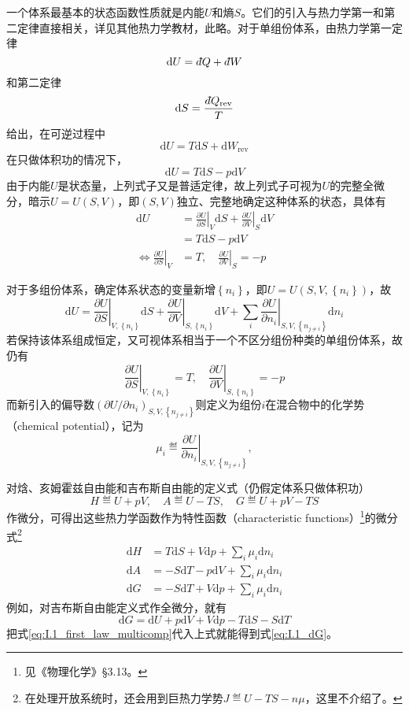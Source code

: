 \documentclass[main.tex]{subfiles}
\begin{document}
一个体系最基本的状态函数性质就是内能$U$和熵$S$。它们的引入与热力学第一和第二定律直接相关，详见其他热力学教材，此略。对于单组份体系，由热力学第一定律
\[\mathrm{d}U=d\hspace*{-0.08em}\bar{}\hspace*{0.1em} Q+d\hspace*{-0.08em}\bar{}\hspace*{0.1em} W\]
和第二定律
\[\mathrm{d} S=\frac{d\hspace*{-0.08em}\bar{}\hspace*{0.1em} Q_\text{rev}}{T}\]
给出，在可逆过程中
\[\mathrm{d}U=T\mathrm{d}S+\mathrm{d}W_\text{rev}\]
在只做体积功的情况下，
\[\mathrm{d}U=T\mathrm{d}S-p\mathrm{d}V\]
由于内能$U$是状态量，上列式子又是普适定律，故上列式子可视为$U$的完整全微分，暗示$U=U\left(S,V\right)$，即$\left(S,V\right)$独立、完整地确定这种体系的状态，具体有
\begin{align*}
    \mathrm{d}U                                                   & =\left.\frac{\partial U}{\partial S}\right|_V\mathrm{d}S+\left.\frac{\partial U}{\partial V}\right|_{S}\mathrm{d}V \\
                                                                  & =T\mathrm{d}S-p\mathrm{d}V                                                                                         \\
    \Leftrightarrow\left.\frac{\partial U}{\partial S}\right|_{V} & =T,\quad\left.\frac{\partial U}{\partial V}\right|_{S}=-p
\end{align*}

对于多组份体系，确定体系状态的变量新增$\left\{n_i\right\}$，即$U=U\left(S,V,\left\{n_i\right\}\right)$，故
\begin{equation}\label{eq:I.1_first_law_multicomp}
    \mathrm{d}U=\left.\frac{\partial U}{\partial S}\right|_{V,\left\{n_i\right\}}\mathrm{d}S+\left.\frac{\partial U}{\partial V}\right|_{S,\left\{n_i\right\}}\mathrm{d}V+\sum_i\left.\frac{\partial U}{\partial n_i}\right|_{S,V,\left\{n_{j\neq i}\right\}}\mathrm{d}n_i
\end{equation}
若保持该体系组成恒定，又可视体系相当于一个不区分组份种类的单组份体系，故仍有
\[\left.\frac{\partial U}{\partial S}\right|_{V,\left\{n_i\right\}}=T,\quad\left.\frac{\partial U}{\partial V}\right|_{S,\left\{n_i\right\}}=-p\]
而新引入的偏导数$\left(\partial U/\partial n_i\right)_{S,V,\left\{n_{j\neq i}\right\}}$则定义为组份$i$在混合物中的化学势（chemical potential），记为
\[\mu_i\eqdef\left.\frac{\partial U}{\partial n_i}\right|_{S,V,\left\{n_{j\neq i}\right\}},\]

对焓、亥姆霍兹自由能和吉布斯自由能的定义式（仍假定体系只做体积功）
\[H\eqdef U+pV,\quad A\eqdef U-TS,\quad G\eqdef U+pV-TS\]
作微分，可得出这些热力学函数作为特性函数（characteristic functions）\footnote{见《物理化学》\S 3.13。}的微分式\footnote{在处理开放系统时，还会用到巨热力学势$J\eqdef U-TS-n\mu$，这里不介绍了。}
\begin{align}
    \mathrm{d}H & = T\mathrm{d}S+V\mathrm{d}p+\sum_i\mu_i\mathrm{d}n_i\label{eq:I.1_dH} \\
    \mathrm{d}A & =-S\mathrm{d}T-p\mathrm{d}V+\sum_i\mu_i\mathrm{d}n_i\label{eq:I.1_dA} \\
    \mathrm{d}G & =-S\mathrm{d}T+V\mathrm{d}p+\sum_i\mu_i\mathrm{d}n_i\label{eq:I.1_dG}
\end{align}
例如，对吉布斯自由能定义式作全微分，就有
\[\mathrm{d}G=\mathrm{d}U+p\mathrm{d}V+V\mathrm{d}p-T\mathrm{d}S-S\mathrm{d}T\]
把式\eqref{eq:I.1_first_law_multicomp}代入上式就能得到式\eqref{eq:I.1_dG}。
\end{document}
